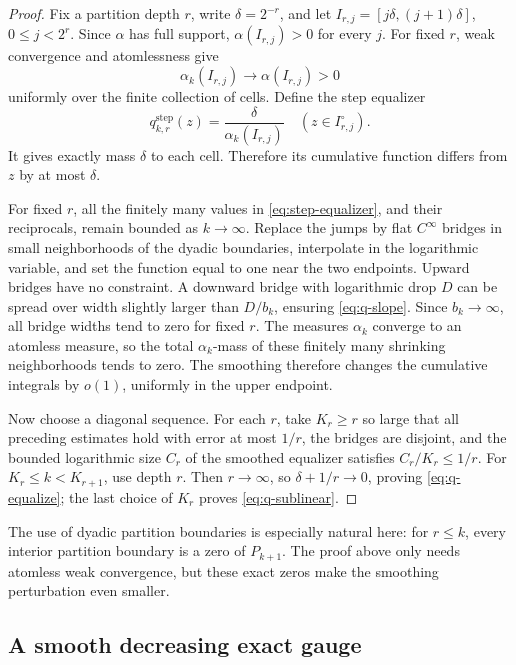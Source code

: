 \documentclass[11pt,oneside]{article}
\theoremstyle{definition}
\theoremstyle{remark}
\begin{document}
\begin{proof}
Fix a partition depth \(r\), write \(\delta=2^{-r}\), and let
\(I_{r,j}=[j\delta,(j+1)\delta]\), \(0\le j<2^r\).  Since \(\alpha\) has
full support,
\(\alpha(I_{r,j})>0\) for every \(j\).  For fixed \(r\), weak convergence
and atomlessness give
\[
 \alpha_k(I_{r,j})\longrightarrow\alpha(I_{r,j})>0
\]
uniformly over the finite collection of cells.  Define the step equalizer
\begin{equation}
 q_{k,r}^{\mathrm{step}}(z)
 =\frac{\delta}{\alpha_k(I_{r,j})}
 \quad(z\in I_{r,j}^{\circ}).
 \label{eq:step-equalizer}
\end{equation}
It gives exactly mass \(\delta\) to each cell.  Therefore its cumulative
function differs from \(z\) by at most \(\delta\).

For fixed \(r\), all the finitely many values in
\eqref{eq:step-equalizer}, and their reciprocals, remain bounded as
\(k\to\infty\).  Replace the jumps by flat \(C^\infty\) bridges in small
neighborhoods of the dyadic boundaries, interpolate in the logarithmic
variable, and set the function equal to one near the two endpoints.  Upward
bridges have no constraint.  A downward bridge with logarithmic drop \(D\)
can be spread over width slightly larger than \(D/b_k\), ensuring
\eqref{eq:q-slope}.  Since \(b_k\to\infty\), all bridge widths tend to zero
for fixed \(r\).  The measures \(\alpha_k\) converge to an atomless measure,
so the total \(\alpha_k\)-mass of these finitely many shrinking neighborhoods
tends to zero.  The smoothing therefore changes the cumulative integrals by
\(o(1)\), uniformly in the upper endpoint.

Now choose a diagonal sequence.  For each \(r\), take \(K_r\ge r\) so large that
all preceding estimates hold with error at most \(1/r\), the bridges are
disjoint, and the bounded logarithmic size \(C_r\) of the smoothed equalizer
satisfies \(C_r/K_r\le1/r\).  For
\(K_r\le k<K_{r+1}\), use depth \(r\).  Then \(r\to\infty\), so
\(\delta+1/r\to0\), proving \eqref{eq:q-equalize}; the last choice of
\(K_r\) proves \eqref{eq:q-sublinear}.
\end{proof}

The use of dyadic partition boundaries is especially natural here: for
\(r\le k\), every interior partition boundary is a zero of \(P_{k+1}\).
The proof above only needs atomless weak convergence, but these exact zeros make
the smoothing perturbation even smaller.

\subsection{A smooth decreasing exact gauge}
\end{document}
